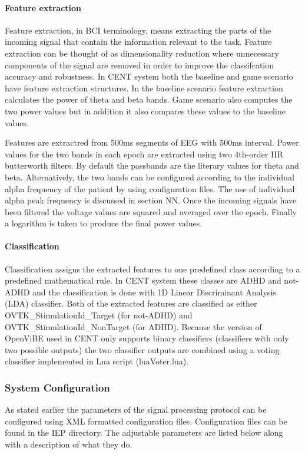 \paragraph{Feature extraction}
Feature extraction, in BCI terminology, means extracting the parts of the incoming signal that contain the information relevant to the task. Feature extraction can be thought of as dimensionality reduction where unnecessary components of the signal are removed in order to improve the classifcation accuracy and robustness. In CENT system both the baseline and game scenario have feature extraction structures. In the baseline scenario feature extraction calculates the power of theta and beta bands. Game scenario also computes the two power values but in addition it also compares these values to the baseline values.

Features are extractred from 500ms segments of EEG with 500ms interval. Power values for the two bands in each epoch are extracted using two 4th-order IIR butterworth filters. By default the passbands are the literary values for theta and beta. Alternatively, the two bands can be configured according to the individual alpha frequency of the patient by using configuration files. The use of individual alpha peak frequency is discussed in section NN. Once the incoming signals have been filtered the voltage values are squared and averaged over the epoch. Finally a logarithm is taken to produce the final power values.  

\paragraph{Classification}
Classification assigns the extracted features to one predefined class according to a predefined mathematical rule. In CENT system these classes are ADHD and not-ADHD and the classification is done with 1D Linear Discriminant Analysis (LDA) classifier. Both of the extracted features are classified as either OVTK\_StimulationId\_Target (for not-ADHD) and OVTK\_StimulationId\_NonTarget (for ADHD). Because the version of OpenViBE used in CENT only supports binary classifiers (classifiers with only two possible outputs) the two classifier outputs are combined using a voting classifier implemented in Lua script (luaVoter.lua). 

\subsubsection{System Configuration}
As stated earlier the parameters of the signal processing protocol can be configured using XML formatted configuration files. Configuration files can be found in the IEP directory. The adjustable parameters are listed below along with a description of what they do.

